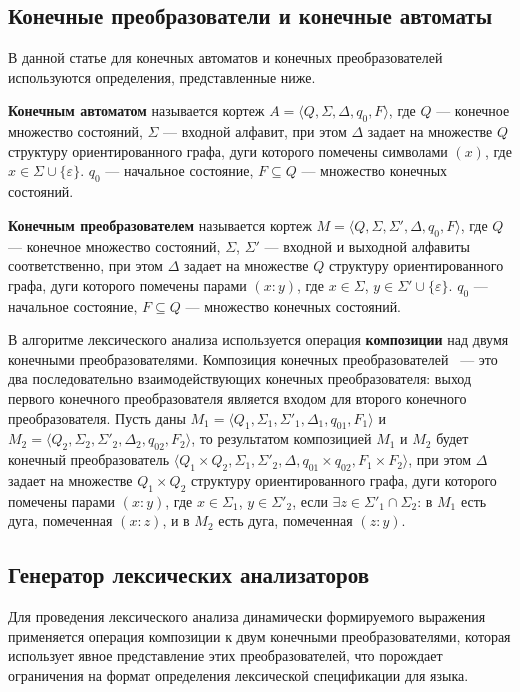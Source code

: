 \documentclass[10pt, conference, compsocconf]{IEEEtran}
\begin{document}
\subsection{Конечные преобразователи и конечные автоматы}

В данной статье для конечных автоматов и конечных преобразователей используются определения, представленные ниже. 

\textbf{Конечным автоматом} называется кортеж $A = \langle Q, \Sigma, \Delta, q_0, F \rangle$, где $Q$ --- конечное множество состояний, $\Sigma$ --- входной алфавит, при этом $\Delta$ задает на множестве $Q$ структуру ориентированного графа, дуги которого помечены символами $(x)$, где $x \in \Sigma \cup \{\varepsilon \}$. $q_0$ ---  начальное состояние, $F \subseteq Q$ --- множество конечных состояний. 

\textbf{Конечным преобразователем} называется кортеж $M = \langle Q, \Sigma, \Sigma', \Delta, q_0, F \rangle$, где $Q$ --- конечное множество состояний, $\Sigma$, $\Sigma'$ --- входной и выходной алфавиты соответственно, при этом $\Delta$ задает на множестве $Q$ структуру ориентированного графа, дуги которого помечены парами $(x : y)$, где $x \in \Sigma$, $y \in \Sigma' \cup \{\varepsilon \}$. $q_0$ --- начальное состояние, $F \subseteq Q$ --- множество конечных состояний. 

В алгоритме лексического анализа используется операция \textbf{композиции} над двумя конечными преобразователями. Композиция конечных преобразователей~\cite{FST} --- это два последовательно взаимодействующих конечных преобразователя: выход первого конечного преобразователя является входом для второго конечного преобразователя. Пусть даны $M_1 = \langle Q_1, \Sigma_1, \Sigma'_1, \Delta_1, q_{01}, F_1 \rangle$ и $M_2 = \langle Q_2, \Sigma_2, \Sigma'_2, \Delta_2, q_{02}, F_2 \rangle$, то результатом композицией $M_1$ и $M_2$ будет конечный преобразователь $\langle Q_1 \times Q_2, \Sigma_1, \Sigma'_2, \Delta, q_{01} \times q_{02}, F_1 \times F_2 \rangle$, при этом $\Delta$ задает на множестве $Q_1 \times Q_2$ структуру ориентированного графа, дуги которого помечены парами $(x : y)$, где $x \in \Sigma_1$, $y \in \Sigma'_2$, если $\exists z \in \Sigma'_1 \cap \Sigma_2$: в $M_1$ есть дуга, помеченная $(x : z)$, и в $M_2$ есть дуга, помеченная $(z : y)$.

\subsection{Генератор лексических анализаторов}
Для проведения лексического анализа динамически формируемого выражения применяется операция композиции к двум конечными преобразователями, которая использует явное представление этих преобразователей, что порождает ограничения на формат определения лексической спецификации для языка. 
\end{document}
